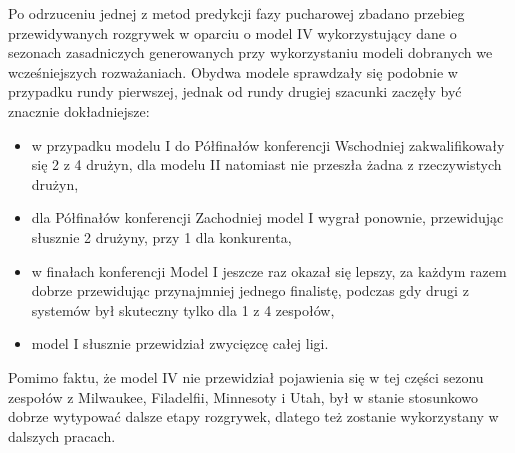\documentclass[inzynierska]{pwr_wmat_praca_dyplomowa}
\theoremstyle{plain}
\numberwithin{theorem}{chapter}
\theoremstyle{definition}
\numberwithin{theorem}{chapter}
\begin{document}
Po odrzuceniu jednej z metod predykcji fazy pucharowej zbadano przebieg przewidywanych rozgrywek w oparciu o model IV wykorzystujący dane o sezonach zasadniczych generowanych przy wykorzystaniu modeli dobranych we wcześniejszych rozważaniach. Obydwa modele sprawdzały się podobnie w przypadku rundy pierwszej, jednak od rundy drugiej szacunki zaczęły być znacznie dokładniejsze:
\begin{itemize}
	\item w przypadku modelu I do Półfinałów konferencji Wschodniej zakwalifikowały się 2 z 4 drużyn, dla modelu II natomiast nie przeszła żadna z rzeczywistych drużyn,
	\item dla Półfinałów konferencji Zachodniej model I wygrał ponownie,  przewidując słusznie 2 drużyny, przy 1 dla konkurenta,
	\item w finałach konferencji Model I jeszcze raz okazał się lepszy, za każdym razem dobrze przewidując przynajmniej jednego finalistę, podczas gdy drugi z systemów był skuteczny tylko dla 1 z 4 zespołów,
	\item model I słusznie przewidział zwycięzcę całej ligi.
\end{itemize}
Pomimo faktu, że model IV nie przewidział pojawienia się w tej części sezonu zespołów z Milwaukee, Filadelfii, Minnesoty i Utah, był w stanie stosunkowo dobrze wytypować dalsze etapy rozgrywek, dlatego też zostanie wykorzystany w dalszych pracach.
\end{document}
